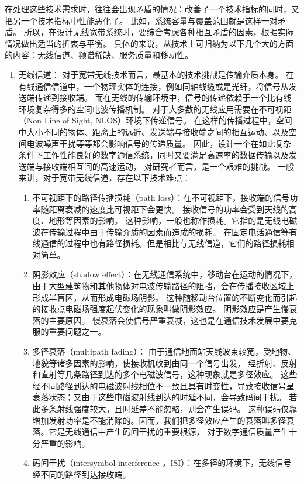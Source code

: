 在处理这些技术需求时，往往会出现矛盾的情况：改善了一个技术指标的同时，又把另一个技术指标中性能恶化了。
比如，系统容量与覆盖范围就是这样一对矛盾。
所以，在设计无线宽带系统时，要综合考虑各种相互矛盾的因素，根据实际情况做出适当的折衷与平衡。
具体的来说，从技术上可归纳为以下几个大的方面的内容：无线信道、频谱稀缺、服务质量和移动性。
\begin{enumerate}[1)]
    \item {无线信道：}
对于宽带无线技术而言，最基本的技术挑战是传输介质本身。
在有线通信信道中，一个物理实体的连接，例如同轴线缆或是光纤，将信号从发送端传递到接收端。
而在无线的传输环境中，信号的传递依赖于一个比有线环境复杂得多的空间电波传播机制。
对于大多数的无线应用需要在不可视距（Non Line of Sight, NLOS）环境下传递信号。
在这样的传播过程中，空间中大小不同的物体、距离上的远近、发送端与接收端之间的相互运动、以及空间电波噪声干扰等等都会影响信号的传递质量。
因此，设计一个在如此复杂条件下工作性能良好的数字通信系统，同时又要满足高速率的数据传输以及发送端与接收端相互间的高速运动，
对研究者而言，是一个艰难的挑战。
一般来讲，对于宽带无线信道，存在以下技术难点：
\begin{enumerate}[(1)]
\item 不可视距下的路径传播损耗（path loss）：在不可视距下，接收端的信号功率随距离衰减的速度比可视距下会更快。
接收信号的功率会受到天线的高度、地形等因素的影响。
这种影响，一般也称作损耗。它指的是无线电磁波在传输过程中由于传输介质的因素而造成的损耗。
在固定电话通信等有线通信的过程中也有路径损耗。但是相比与无线信道，它们的路径损耗相对简单。
\item 阴影效应（shadow effect）：在无线通信系统中，移动台在运动的情况下，由于大型建筑物和其他物体对电波传输路径的阻挡，会在传播接收区域上形成半盲区，从而形成电磁场阴影。
这种随移动台位置的不断变化而引起的接收点电磁场强度起伏变化的现象叫做阴影效应。
阴影效应是产生慢衰落的主要原因。
慢衰落会使信号严重衰减，这也是在通信技术发展中要克服的重要问题之一。
\item 多径衰落（multipath fading）： 由于通信地面站天线波束较宽，受地物、地貌等诸多因素的影响，使接收机收到由同一个信号出发，
    经折射、反射和直射等几条路径到达的多个电磁波信号，这种现象就是多径效应。
这些经不同路径到达的电磁波射线相位不一致且具有时变性，导致接收信号呈衰落状态；又由于这些电磁波射线到达的时延不同，会导致码间干扰。
若此多条射线强度较大，且时延差不能忽略，则会产生误码。
这种误码仅靠增加发射功率是不能消除的。因而，我们把多径效应产生的衰落叫多径衰落。它是无线通信中产生码间干扰的重要根源，
对于数字通信质量产生十分严重的影响。
\item 码间干扰（intersymbol interference ，ISI）：在多径的环境下，无线信号经不同的路径到达接收端。

\end{enumerate}
\end{enumerate}
